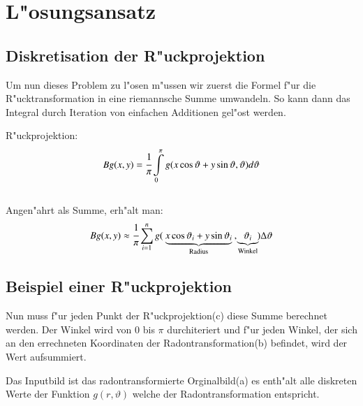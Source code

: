 \section{L"osungsansatz}
\subsection{Diskretisation der R"uckprojektion}

Um nun dieses Problem zu l"osen m"ussen wir zuerst die Formel f"ur die
R"ucktransformation in eine riemannsche Summe umwandeln. So kann dann
das Integral durch Iteration von einfachen Additionen gel"ost werden.

R"uckprojektion:
\begin{equation}
	Bg(x,y) = \cfrac{1}{\pi}\int\limits_0^\pi g(x\cos{\vartheta}+y\sin{\vartheta},\vartheta) d\vartheta
\end{equation}\\
Angen"ahrt als Summe, erh"alt man:
\begin{equation}
	Bg(x,y) \approx \cfrac{1}{\pi}\sum_{i=1}^{n} g(\:\underbrace{x\cos{\vartheta_i}+y\sin{\vartheta_i}}_{\text{Radius}}\:,\!\underbrace{\vartheta_i}_\text{{Winkel}}\!) \Delta\vartheta
\end{equation}

\subsection{Beispiel einer R"uckprojektion}

Nun muss f"ur jeden Punkt der R"uckprojektion(c) diese Summe berechnet
werden. Der Winkel wird von 0 bis $\pi$ durchiteriert und f"ur jeden
Winkel, der sich an den errechneten Koordinaten der Radontransformation(b)
befindet, wird der Wert aufsummiert.

Das Inputbild ist das radontransformierte Orginalbild(a) es enth"alt
alle diskreten Werte der Funktion $g(r,\vartheta)$ welche der
Radontransformation entspricht.

